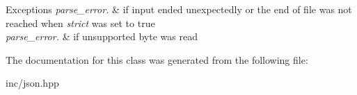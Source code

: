 \begin{DoxyExceptions}{Exceptions}
{\em parse\+\_\+error.} & if input ended unexpectedly or the end of file was not reached when {\itshape strict} was set to true \\
\hline
{\em parse\+\_\+error.} & if unsupported byte was read \\
\hline
\end{DoxyExceptions}


The documentation for this class was generated from the following file\+:\begin{DoxyCompactItemize}
\item 
inc/json.\+hpp\end{DoxyCompactItemize}
